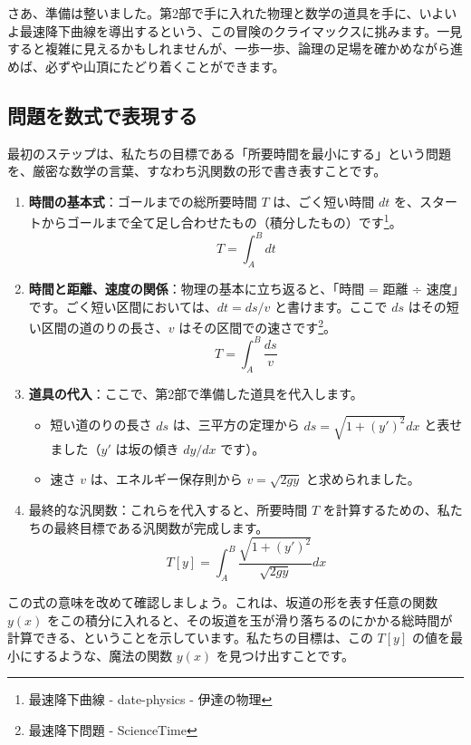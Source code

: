 \documentclass[a4paper,12pt]{bxjsarticle}
\begin{document}
さあ、準備は整いました。第2部で手に入れた物理と数学の道具を手に、いよいよ最速降下曲線を導出するという、この冒険のクライマックスに挑みます。一見すると複雑に見えるかもしれませんが、一歩一歩、論理の足場を確かめながら進めば、必ずや山頂にたどり着くことができます。

\subsection{問題を数式で表現する}

最初のステップは、私たちの目標である「所要時間を最小にする」という問題を、厳密な数学の言葉、すなわち汎関数の形で書き表すことです。

\begin{enumerate}
\item \textbf{時間の基本式}：ゴールまでの総所要時間 $T$ は、ごく短い時間 $dt$ を、スタートからゴールまで全て足し合わせたもの（積分したもの）です\footnote{最速降下曲線 - date-physics - 伊達の物理}。
\begin{equation}
T=\int_A^B dt
\end{equation}

\item \textbf{時間と距離、速度の関係}：物理の基本に立ち返ると、「時間 = 距離 ÷ 速度」です。ごく短い区間においては、$dt=ds/v$ と書けます。ここで $ds$ はその短い区間の道のりの長さ、$v$ はその区間での速さです\footnote{最速降下問題 - ScienceTime}。
\begin{equation}
T=\int_A^B \frac{ds}{v}
\end{equation}

\item \textbf{道具の代入}：ここで、第2部で準備した道具を代入します。
\begin{itemize}
\item 短い道のりの長さ $ds$ は、三平方の定理から $ds=\sqrt{1+(y')^2}dx$ と表せました（$y'$ は坂の傾き $dy/dx$ です）。
\item 速さ $v$ は、エネルギー保存則から $v=\sqrt{2gy}$ と求められました。
\end{itemize}

\item 最終的な汎関数：これらを代入すると、所要時間 $T$ を計算するための、私たちの最終目標である汎関数が完成します。
\begin{equation}
T[y]=\int_A^B \frac{\sqrt{1+(y')^2}}{\sqrt{2gy}} dx
\end{equation}
\end{enumerate}

この式の意味を改めて確認しましょう。これは、坂道の形を表す任意の関数 $y(x)$ をこの積分に入れると、その坂道を玉が滑り落ちるのにかかる総時間が計算できる、ということを示しています。私たちの目標は、この $T[y]$ の値を最小にするような、魔法の関数 $y(x)$ を見つけ出すことです。
\end{document}
